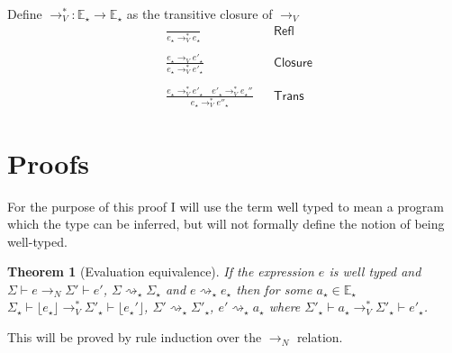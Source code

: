 \documentclass[float=false, crop=false]{standalone}
\newtheorem{theorem}{Theorem}
\numberwithin{subcase}{case}
\newcommand{\tlang}{\star}
\newcommand{\unwrap}[1]{\lfloor #1 \rfloor}
\newcommand{\tcbn}{\rightarrow_N}
\newcommand{\tcbv}{\rightarrow_V}
\newcommand{\tccbv}{\rightarrow_V^*}
\newcommand{\tlthunk}{\rightsquigarrow_\tlang}
\begin{document}
Define $\tccbv: \mathbb{E}_\tlang \rightarrow \mathbb{E}_\tlang$ as the transitive closure of $\tcbv$
\begin{align*}
  &\frac{}{e_\tlang \tccbv e_\tlang} && \mathsf{Refl}\\ \\
  &\frac{e_\tlang \tcbv e'_\tlang}{e_\tlang \tccbv e'_\tlang} 
    && \mathsf{Closure}\\ \\
  &\frac{e_\tlang \tccbv e'_\tlang \quad e'_\tlang \tccbv e_\tlang'' }{e_\tlang \tccbv e''_\tlang} && \mathsf{Trans}
\end{align*}

\section{Proofs}

For the purpose of this proof I will use the term well typed to mean a program which the 
type can be inferred, but will not formally define the notion of being well-typed.

\begin{theorem}[Evaluation equivalence]
If the expression $e$ is well typed and
\mbox{$\Sigma \vdash e \tcbn \Sigma' \vdash e'$}, $\Sigma \tlthunk \Sigma_\tlang$ and \mbox{$e \tlthunk e_\tlang$} 
then for some $a_\tlang \in \mathbb{E}_\tlang$ 
\mbox{$\Sigma_\tlang \vdash \unwrap{e_\tlang}\tccbv \Sigma'_\tlang \vdash \unwrap{e_\tlang'}$},
\mbox{$\Sigma' \tlthunk \Sigma'_\tlang$}, \mbox{$e' \tlthunk a_\tlang$} where 
\mbox{$\Sigma'_\tlang \vdash a_\tlang \tccbv \Sigma'_\tlang \vdash  e'_\tlang$}.
\end{theorem}



This will be proved by rule induction over the $\tcbn$ relation. 
\end{document}
